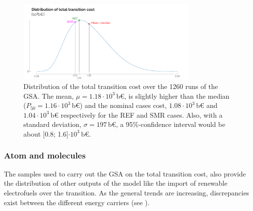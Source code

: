 \documentclass[11pt,twoside,a4paper,english]{article}
\def\ie{i.e.,}
\begin{document}
\begin{figure}[htbp!]
\centering
\includegraphics[width=0.8\textwidth]{UQ_PDF_total_transition_cost.pdf}
\caption{Distribution of the total transition cost over the 1260 runs of the \acrfull{GSA}. The mean, $\mu=1.18\cdot10^3$\,b€, is slightly higher than the median ($P_{50}=1.16\cdot10^3$\,b€) and the nominal cases cost, $1.08\cdot10^3$\,b€ and $1.04\cdot10^3$\,b€ respectively for the REF and SMR cases. Also, with a standard deviation, $\sigma=197$\,b€, a 95\%-confidence interval would be about [0.8; 1.6]$\cdot10^3$\,b€.}
\label{fig:UQ_PDF_total_transition_cost}
\end{figure}

\subsubsection{Atom and molecules}
\label{subsubsec:atom_mol:results_atom_mol}
The samples used to carry out the \gls{GSA} on the total transition cost, also provide the distribution of other outputs of the model like the import of renewable electrofuels over the transition. As the general trends are increasing, discrepancies exist between the different energy carriers (see ).
%
\end{document}

